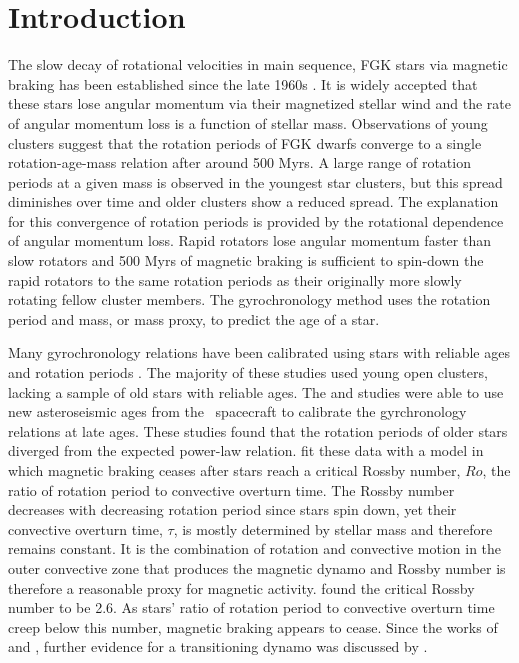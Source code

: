 \newcommand{\nastero}{40}
\newcommand{\meansep}{1}

\section{Introduction}

The slow decay of rotational velocities in main sequence, FGK stars via
magnetic braking has been established since the late 1960s
\citep[\eg][]{Weber, Skumanich}.
It is widely accepted that these stars lose angular momentum via their
magnetized stellar wind and the rate of angular momentum loss is a function of
stellar mass.
Observations of young clusters suggest that the rotation periods of FGK dwarfs
converge to a single rotation-age-mass relation after around 500 Myrs.
A large range of rotation periods at a given mass is observed in the youngest
star clusters, but this spread diminishes over time and older clusters show a
reduced spread.
The explanation for this convergence of rotation periods is provided by the
rotational dependence of angular momentum loss.
Rapid rotators lose angular momentum faster than slow rotators and 500 Myrs of
magnetic braking is sufficient to spin-down the rapid rotators to the same
rotation periods as their originally more slowly rotating fellow cluster
members.
The gyrochronology method uses the rotation period and mass, or mass proxy,
to predict the age of a star.

Many gyrochronology relations have been calibrated using stars with reliable
ages and rotation periods \citep[\eg][]{Barnes2007, Mamajek2008, Meibom2010,
Angus2015, Vansaders2016}.
The majority of these studies used young open clusters, lacking a sample of
old stars with reliable ages.
The \citet{Angus2015} and \citet{Vansaders2016} studies were able to use new
asteroseismic ages from the \kepler\ spacecraft to calibrate the gyrchronology
relations at late ages.
These studies found that the rotation periods of older stars diverged from the
expected power-law relation.
\citet{Vansaders2016} fit these data with a model in which magnetic braking
ceases after stars reach a critical Rossby number, $Ro$, the ratio of rotation
period to convective overturn time.
The Rossby number decreases with decreasing rotation period since stars spin
down, yet their convective overturn time, $\tau$, is mostly determined by
stellar mass and therefore remains constant.
It is the combination of rotation and convective motion in the outer
convective zone that produces the magnetic dynamo and Rossby number is
therefore a reasonable proxy for magnetic activity.
\citet{Vansaders2016} found the critical Rossby number to be 2.6.
As stars' ratio of rotation period to convective overturn time creep below
this number, magnetic braking appears to cease.
Since the works of \citet{Angus2015} and \citet{Vansaders2016}, further
evidence for a transitioning dynamo was discussed by \citet{...}.


